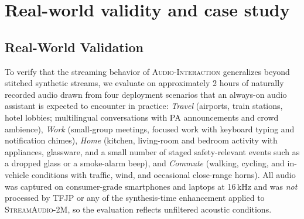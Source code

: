 \documentclass{article}
\begin{document}
\newpage 


\newpage


\appendix


\section{Real-world validity and case study}
\subsection{Real-World Validation}
\label{appendix:realworld}

To verify that the streaming behavior of \textsc{Audio-Interaction} generalizes beyond stitched synthetic streams, we evaluate on approximately 2 hours of naturally recorded audio drawn from four deployment scenarios that an always-on audio assistant is expected to encounter in practice: \textit{Travel} (airports, train stations, hotel lobbies; multilingual conversations with PA announcements and crowd ambience), \textit{Work} (small-group meetings, focused work with keyboard typing and notification chimes), \textit{Home} (kitchen, living-room and bedroom activity with appliances, glassware, and a small number of staged safety-relevant events such as a dropped glass or a smoke-alarm beep), and \textit{Commute} (walking, cycling, and in-vehicle conditions with traffic, wind, and occasional close-range horns). All audio was captured on consumer-grade smartphones and laptops at 16\,kHz and was \emph{not} processed by TFJP or any of the synthesis-time enhancement applied to \textsc{StreamAudio-2M}, so the evaluation reflects unfiltered acoustic conditions.
\end{document}
